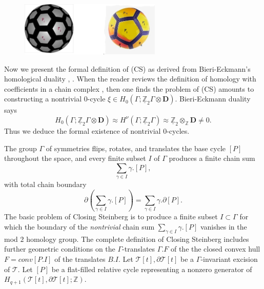 \documentclass[12pt]{amsart}
\theoremstyle{definition}
\theoremstyle{remark}
\newcommand{\bZ}{\mathbb{Z}}
\newcommand{\del}{\partial}
\newcommand{\bD}{\textbf{D}}
\newcommand{\sT}{\mathscr{T}}
\begin{document}


\begin{figure}\label{nikeball}
\centering
\includegraphics[width=0.6\textwidth]{ball-nike-pitch.jpg}
\caption{}
\end{figure}

Now we present the formal definition of (CS) as derived from Bieri-Eckmann's homological duality \cite{BiEck}, \cite{BS}. When the reader reviews the definition of homology with coefficients in a chain complex \cite{Brown}, then one finds the problem of (CS) amounts to constructing a nontrivial $0$-cycle $\xi \in H_0(\Gamma; \underline{\bZ}_2 \Gamma \otimes \bD)$. Bieri-Eckmann duality says $$H_0(\Gamma; \underline{\bZ}_2 \Gamma \otimes \bD) \approx H^\nu(\Gamma; \underline{\bZ}_2 \Gamma)\approx \underline{\bZ}_2 \otimes_\bZ \textbf{D}\neq 0.$$ Thus we deduce the formal existence of nontrivial $0$-cycles. %

The group $\Gamma$ of symmetries flips, rotates, and translates the base cycle $[P]$ throughout the space, and every finite subset $I$ of $\Gamma$ produces a finite chain sum $$\sum_{\gamma\in I} \gamma.[P],$$ with total chain boundary $$\del(\sum_{\gamma\in I} \gamma.[P])=\sum_{\gamma\in I} \gamma.\del [P].$$ The basic problem of Closing Steinberg is to produce a finite subset $I \subset \Gamma$ for which the boundary of the \emph{nontrivial} chain sum $\sum_{\gamma\in I} \gamma.[P]$ vanishes in the mod $2$ homology group. The complete definition of Closing Steinberg includes further geometric conditions on the $\Gamma$-translates $\Gamma.F$ of the the closed convex hull $F=conv[P.I]$ of the translates $B.I$. Let $\sT[t], \del \sT[t]$ be a $\Gamma$-invariant excision of $\sT$. Let $[P]$ be a flat-filled relative cycle representing a nonzero generator of $H_{q+1}(\sT[t], \del \sT[t]; \bZ)$.
\end{document}
